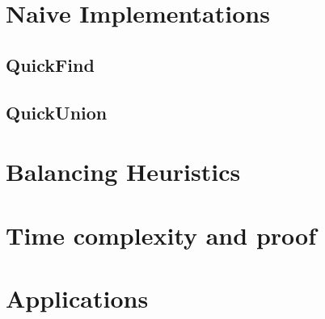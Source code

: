 \documentclass{article}
\begin{document}
\section{Naive Implementations}
\subsection{QuickFind}

\subsection{QuickUnion}
 
\section{Balancing Heuristics}
\section{Time complexity and proof}
\section{Applications}


\end{document}
